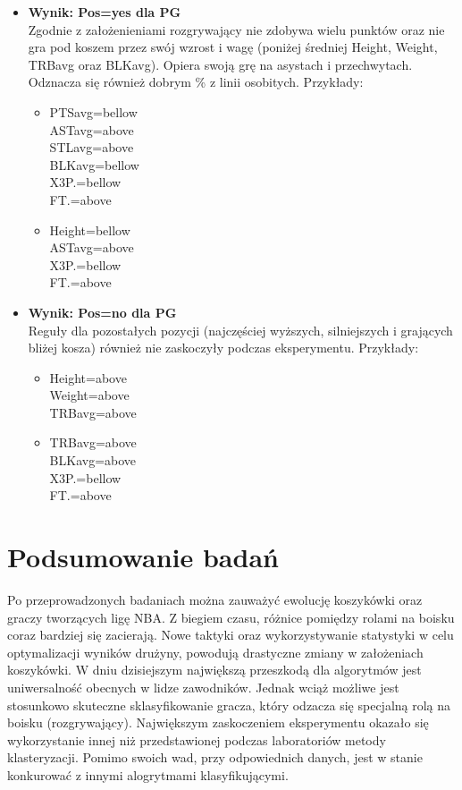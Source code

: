 \documentclass[twoside,twocolumn]{article}
\begin{document}
\begin{itemize}
\item \textbf{Wynik: Pos=yes dla PG}\\
Zgodnie z założenieniami rozgrywający nie zdobywa wielu punktów oraz nie gra pod koszem przez swój wzrost i wagę (poniżej średniej Height, Weight, TRBavg oraz BLKavg). Opiera swoją grę na asystach i przechwytach. Odznacza się również dobrym \% z linii osobitych. Przykłady:
\begin{itemize}
	\item PTSavg=bellow \\ ASTavg=above\\ STLavg=above\\ BLKavg=bellow\\ X3P.=bellow \\ FT.=above \\
	\item Height=bellow \\ ASTavg=above \\ X3P.=bellow \\ FT.=above
\end{itemize}
\end{itemize}

\begin{itemize}
\item \textbf{Wynik: Pos=no dla PG}\\
Reguły dla pozostałych pozycji (najczęściej wyższych, silniejszych i grających bliżej kosza) również nie zaskoczyły podczas eksperymentu. Przykłady:
\begin{itemize}
	\item Height=above \\ Weight=above \\ TRBavg=above \\
	\item TRBavg=above \\ BLKavg=above \\ X3P.=bellow \\ FT.=above
\end{itemize}
\end{itemize}


\section{Podsumowanie badań}

\indent Po przeprowadzonych badaniach można zauważyć ewolucję koszykówki oraz graczy tworzących ligę NBA. Z biegiem czasu, różnice pomiędzy rolami na boisku coraz bardziej się zacierają. Nowe taktyki oraz wykorzystywanie statystyki w celu optymalizacji wyników drużyny, powodują drastyczne zmiany w założeniach koszykówki. W dniu dzisiejszym największą przeszkodą dla algorytmów jest uniwersalność obecnych w lidze zawodników. Jednak wciąż możliwe jest stosunkowo skuteczne sklasyfikowanie gracza, który odzacza się specjalną rolą na boisku (rozgrywający). Największym zaskoczeniem eksperymentu okazało się wykorzystanie innej niż przedstawionej podczas laboratoriów metody klasteryzacji. Pomimo swoich wad, przy odpowiednich danych, jest w stanie konkurować z innymi alogrytmami klasyfikującymi.
\end{document}
